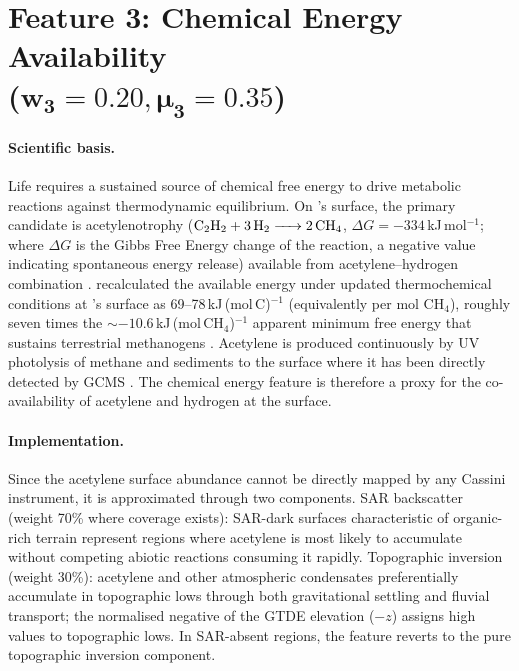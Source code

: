 \section[Feature 3: Chemical Energy Availability 
  ($w_3 = 0.20$, $\mu_3 = 0.35$)]{Feature 3: Chemical Energy Availability \\
  ($\boldsymbol{w_3 = 0.20, \mu_3 = 0.35}$)}
\label{sec:feat_energy}

\paragraph{Scientific basis.}
Life requires a sustained source of chemical free energy to drive metabolic
reactions against thermodynamic equilibrium.  On \titan{}'s surface, the
primary candidate is acetylenotrophy ($\ce{C2H2 + 3H2 -> 2CH4}$, $\Delta G = -334$\,kJ\,mol$^{-1}$; where $\Delta G$ is the Gibbs Free Energy
change of the reaction, a negative value indicating spontaneous energy release)
available from acetylene--hydrogen combination \citep{McKaySmith2005}.  \citet{Yanez2024} recalculated the
available energy under updated thermochemical conditions at \titan{}'s surface
as 69--78\,kJ\,(mol\,C)$^{-1}$ (equivalently per mol CH$_4$), roughly seven times the $\sim$$-10.6$\,kJ\,(mol\,CH$_4$)$^{-1}$ apparent minimum free energy that sustains terrestrial methanogens \citep{Hoehler2001}.  Acetylene is produced continuously by UV photolysis of methane
and sediments to the surface where it has been directly detected by GCMS
\citep{Niemann2005}.  The chemical energy feature is therefore a proxy for
the co-availability of acetylene and hydrogen at the surface.

\paragraph{Implementation.}
Since the acetylene surface abundance cannot be directly mapped by any Cassini
instrument, it is approximated through two components.  SAR backscatter
(weight 70\% where coverage exists): SAR-dark surfaces characteristic of
organic-rich terrain represent regions where acetylene is most likely to
accumulate without competing abiotic reactions consuming it rapidly.
Topographic inversion (weight 30\%): acetylene and other atmospheric
condensates preferentially accumulate in topographic lows through both
gravitational settling and fluvial transport; the normalised negative of
the GTDE elevation ($-z$) assigns high values to topographic lows.
In SAR-absent regions, the feature reverts to the pure topographic
inversion component.

